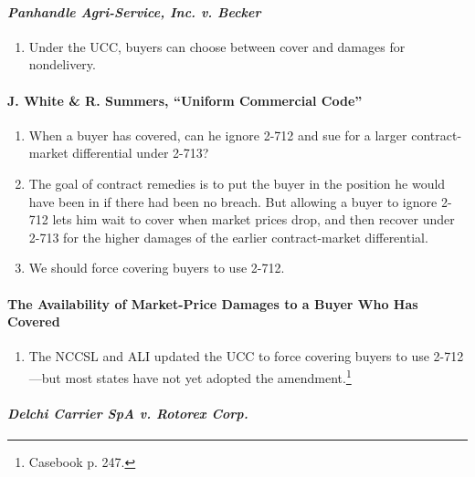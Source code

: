 \paragraph{\emph{Panhandle Agri-Service, Inc. v. Becker}}

\begin{enumerate}
    \item Under the UCC, buyers can choose between cover and damages for 
    nondelivery.
\end{enumerate}

\paragraph{J. White \& R. Summers, ``Uniform Commercial Code''}

\begin{enumerate}
    \item When a buyer has covered, can he ignore 2-712 and sue for a larger 
    contract-market differential under 2-713?
    \item The goal of contract remedies is to put the buyer in the position he 
    would have been in if there had been no breach. But allowing a buyer to 
    ignore 2-712 lets him wait to cover when market prices drop, and then 
    recover under 2-713 for the higher damages of the earlier contract-market 
    differential.
    \item We should force covering buyers to use 2-712.
\end{enumerate}

\paragraph{The Availability of Market-Price Damages to a Buyer Who Has Covered}

\begin{enumerate}
    \item The NCCSL and ALI updated the UCC to force covering buyers to use 
    2-712---but most states have not yet adopted the 
    amendment.\footnote{Casebook p. 247.}
\end{enumerate}

\paragraph{\emph{Delchi Carrier SpA v. Rotorex Corp.}}


